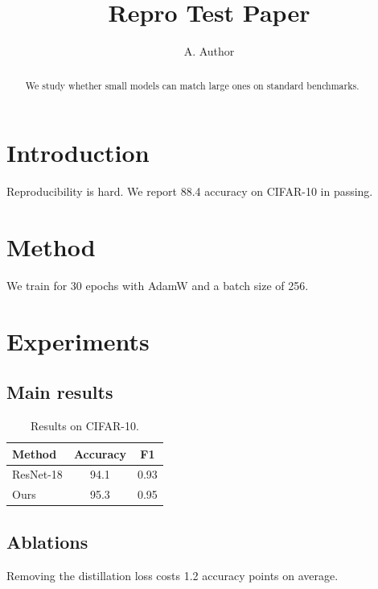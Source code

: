 \documentclass{article}
\title{Repro Test Paper}
\author{A. Author}
\begin{document}
\maketitle

\begin{abstract}
We study whether small models can match large ones on standard benchmarks.
\end{abstract}

\section{Introduction}
Reproducibility is hard. We report 88.4 accuracy on CIFAR-10 in passing.

\section{Method}
We train for 30 epochs with AdamW and a batch size of 256.

\section{Experiments}
\subsection{Main results}

\begin{table}[t]
\caption{Results on CIFAR-10.}
\begin{tabular}{lcc}
\hline
Method & Accuracy & F1 \\
\hline
ResNet-18 & 94.1 & 0.93 \\
Ours & 95.3 & 0.95 \\
\hline
\end{tabular}
\end{table}

\subsection{Ablations}
Removing the distillation loss costs 1.2 accuracy points on average.
\end{document}
